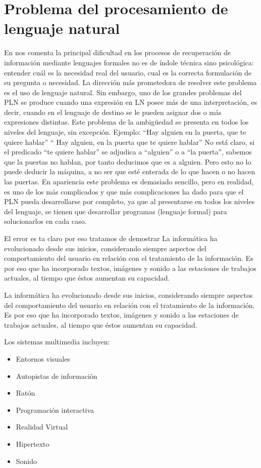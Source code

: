\section{Problema del procesamiento de lenguaje natural}

En \cite{Arquitectura} nos comenta  la principal dificultad en los procesos de recuperación
de información mediante lenguajes formales no es de índole técnica sino psicológica: entender cuál es la necesidad real del usuario, cual es la correcta formulación de su pregunta o necesidad. La dirección más prometedora de resolver este problema es el uso de lenguaje natural. Sin embargo, uno de los grandes problemas del PLN se produce cuando una expresión en LN posee más de una interpretación, es decir, cuando en el lenguaje de destino se le pueden asignar dos o más expresiones distintas. Este problema de la ambigüedad se presenta en todos los niveles del lenguaje, sin excepción. Ejemplo:
“Hay alguien en la puerta, que te quiere hablar”
“ Hay alguien, en la puerta que te quiere hablar”
No está claro, si el predicado “te quiere hablar” se adjudica a “alguien” o a “la puerta”, sabemos que la puertas no hablan, por tanto deducimos que es a alguien. Pero
esto no lo puede deducir la máquina, a no ser que esté enterada de lo que hacen o no hacen las puertas. En apariencia este problema es demasiado sencillo, pero en realidad, es uno de los más complicados y que más complicaciones ha dado para que el PLN pueda desarrollarse por completo, ya que al presentarse en todos los niveles del lenguaje, se tienen que desarrollar programas (lenguaje formal) para solucionarlos en cada caso.

El error es ta claro por eso tratamos de demostrar La informática ha evolucionado desde sus inicios, considerando siempre aspectos del comportamiento del usuario en relación con el tratamiento de la información. Es por eso que ha incorporado textos, imágenes y
sonido a las estaciones de trabajos actuales, al tiempo que éstos aumentan su capacidad.

La informática ha evolucionado desde sus inicios, considerando siempre aspectos del comportamiento del usuario en relación con el tratamiento de la información. Es por eso que ha incorporado textos, imágenes y sonido a las estaciones de trabajos actuales, al tiempo que éstos aumentan su capacidad.

Los sistemas multimedia incluyen:
\begin{itemize}
  \item Entornos visuales
  \item Autopistas de información
  \item Ratón
  \item Programación interactiva
  \item Realidad Virtual
  \item Hipertexto
  \item Sonido
\end{itemize}

